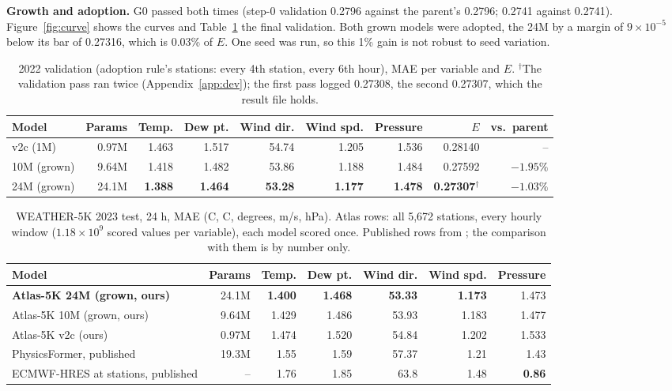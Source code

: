 \documentclass{article}
\begin{document}
\textbf{Growth and adoption.} G0 passed both times (step-0 validation 0.2796 against the parent's 0.2796; 0.2741
against 0.2741). Figure~\ref{fig:curve} shows the curves and Table~\ref{tab:val} the final validation. Both grown models
were adopted, the 24M by a margin of $9\times10^{-5}$ below its bar of 0.27316, which is 0.03\% of $E$. One seed was
run, so this 1\% gain is not robust to seed variation.

\begin{table}[t]
\caption{2022 validation (adoption rule's stations: every 4th station, every 6th hour), MAE per variable and $E$.
$^{\dagger}$The validation pass ran twice (Appendix~\ref{app:dev}); the first pass logged 0.27308, the second 0.27307,
which the result file holds.}
\label{tab:val}
\centering\small
\begin{tabular}{lrrrrrrrr}
\toprule
Model & Params & Temp. & Dew pt. & Wind dir. & Wind spd. & Pressure & $E$ & vs.\ parent\\
\midrule
v2c (1M) & 0.97M & 1.463 & 1.517 & 54.74 & 1.205 & 1.536 & 0.28140 & --\\
10M (grown) & 9.64M & 1.418 & 1.482 & 53.86 & 1.188 & 1.484 & 0.27592 & $-1.95\%$\\
24M (grown) & 24.1M & \textbf{1.388} & \textbf{1.464} & \textbf{53.28} & \textbf{1.177} & \textbf{1.478} & \textbf{0.27307}$^{\dagger}$ & $-1.03\%$\\
\bottomrule
\end{tabular}
\end{table}

\begin{table}[t]
\caption{WEATHER-5K 2023 test, 24 h, MAE (\textdegree C, \textdegree C, degrees, m/s, hPa). Atlas rows: all 5,672
stations, every hourly window ($1.18\times10^9$ scored values per variable), each model scored once. Published rows from
\citet{han2026weather5k}; the comparison with them is by number only.}
\label{tab:test}
\centering\small
\begin{tabular}{lrrrrrr}
\toprule
Model & Params & Temp. & Dew pt. & Wind dir. & Wind spd. & Pressure\\
\midrule
\textbf{Atlas-5K 24M (grown, ours)} & 24.1M & \textbf{1.400} & \textbf{1.468} & \textbf{53.33} & \textbf{1.173} & 1.473\\
Atlas-5K 10M (grown, ours) & 9.64M & 1.429 & 1.486 & 53.93 & 1.183 & 1.477\\
Atlas-5K v2c (ours) & 0.97M & 1.474 & 1.520 & 54.84 & 1.202 & 1.533\\
\midrule
PhysicsFormer, published & 19.3M & 1.55 & 1.59 & 57.37 & 1.21 & 1.43\\
ECMWF-HRES at stations, published & -- & 1.76 & 1.85 & 63.8 & 1.48 & \textbf{0.86}\\
\bottomrule
\end{tabular}
\end{table}
\end{document}
